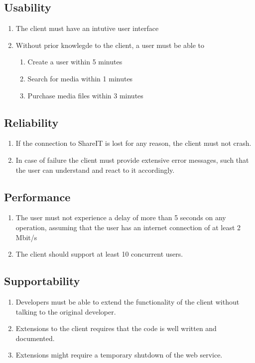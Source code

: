 \documentclass[../report.tex]{subfiles}
\begin{document}
\subsection{Usability}

\begin{enumerate}[label=U\arabic*:]
\item The client must have an intutive user interface
\item Without prior knowlegde to the client, a user must be able to
	\begin{enumerate}
	\item{Create a user within 5 minutes}
	\item Search for media within 1 minutes
	\item Purchase media files within 3 minutes
	\end{enumerate}
\end{enumerate}

\subsection{Reliability}

\begin{enumerate}[label=R\arabic*:]
\item If the connection to ShareIT is lost for any reason, the client must not crash. 
\item In case of failure the client must provide extensive error messages, such that the user can understand and react to it accordingly.
\end{enumerate}

\subsection{Performance}

\begin{enumerate}[label=P\arabic*:]
\item The user must not experience a delay of more than 5 seconds on any operation, assuming that the user has an internet connection of at least 2 Mbit/s
\item The client should support at least 10 concurrent users. 
\end{enumerate}

\subsection{Supportability}

\begin{enumerate}[label=S\arabic*:]
\item Developers must be able to extend the functionality of the client without talking to the original developer. 
\item Extensions to the client requires that the code is well written and documented. 
\item Extensions might require a temporary shutdown of the web service.
\end{enumerate}
\end{document}
